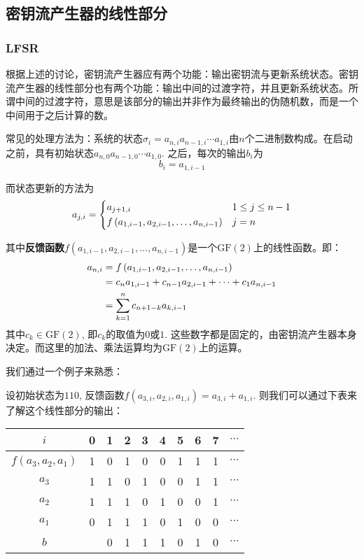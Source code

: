 \documentclass[UTF8]{ctexrep}
\def\pth#1{\left( {#1}\right)}
\def\GF{\mathrm{GF}}
\begin{document}
\subsection{密钥流产生器的线性部分}
\subsubsection{LFSR}
根据上述的讨论，密钥流产生器应有两个功能：输出密钥流与更新系统状态。密钥流产生器的线性部分也有两个功能：输出中间的过渡字符，并且更新系统状态。所谓中间的过渡字符，意思是该部分的输出并非作为最终输出的伪随机数，而是一个中间用于之后计算的数。\par
常见的处理方法为：系统的状态$\sigma_i=a_{n, i}a_{n-1, i}\cdots a_{1, i}$由$n$个二进制数构成。在启动之前，具有初始状态$a_{n, 0}a_{n-1, 0}\cdots a_{1, 0}$. 之后，每次的输出$b_i$为
\begin{equation}
    b_i=a_{1, i-1}
\end{equation}

而状态更新的方法为
\begin{equation}
    a_{j, i}=\begin{dcases}a_{j+1, i}&1\leq j\leq n-1\\f\pth{a_{1, i-1}, a_{2, i-1}, \ldots, a_{n, i-1}}&j=n\end{dcases}
\end{equation}

其中\textbf{反馈函数}$f\pth{a_{1, i-1}, a_{2, i-1}, \ldots, a_{n, i-1}}$是一个$\GF\pth{2}$上的线性函数。即：
\begin{align}
    a_{n, i}&=f\pth{a_{1, i-1}, a_{2, i-1}, \ldots, a_{n, i-1}}\notag\\
    &=c_na_{1, i-1}+c_{n-1}a_{2, i-1}+\cdots +c_1a_{n, i-1}\\
    &=\sum_{k=1}^nc_{n+1-k}a_{k, i-1}
\end{align}
其中$c_k\in\GF\pth{2}$, 即$c_k$的取值为$0$或$1$. 这些数字都是固定的，由密钥流产生器本身决定。而这里的加法、乘法运算均为$\GF\pth{2}$上的运算。\par
我们通过一个例子来熟悉：\par
设初始状态为$110$, 反馈函数$f(a_{3, i}, a_{2, i}, a_{1, i})=a_{3, i}+a_{1, i}$. 则我们可以通过下表来了解这个线性部分的输出：
\begin{table}[H]
    \centering
    \begin{tabular}{c|c|c|c|c|c|c|c|c|c}\hline
        $i$&0&1&2&3&4&5&6&7&$\cdots$\\\hline
        $f(a_3, a_2, a_1)$&1&0&1&0&0&1&1&1&$\cdots$\\\hline
        $a_3$&1&1&0&1&0&0&1&1&$\cdots$\\\hline
        $a_2$&1&1&1&0&1&0&0&1&$\cdots$\\\hline
        $a_1$&0&1&1&1&0&1&0&0&$\cdots$\\\hline
        $b$&&0&1&1&1&0&1&0&$\cdots$\\\hline
    \end{tabular}
\end{table}
\end{document}
